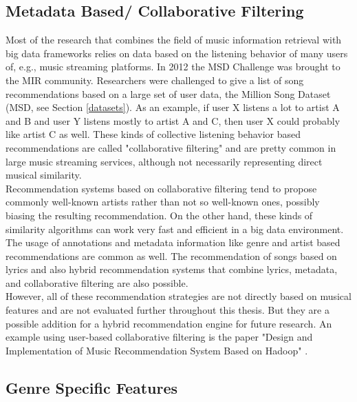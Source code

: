\subsection{Metadata Based/ Collaborative Filtering}\label{collaborative}

Most of the research that combines the field of music information retrieval with big data frameworks relies on data based on the listening behavior of many users of, e.g., music streaming platforms. In 2012 the MSD Challenge was brought to the MIR community. Researchers were challenged to give a list of song recommendations based on a large set of user data, the Million Song Dataset (MSD, see Section \ref{datasets}). As an example, if user X listens a lot to artist A and B and user Y listens mostly to artist A and C, then user X could probably like artist C as well. These kinds of collective listening behavior based recommendations are called "collaborative filtering" and are pretty common in large music streaming services, although not necessarily representing direct musical similarity. \cite[p. 192f.]{knees1}\\
Recommendation systems based on collaborative filtering tend to propose commonly well-known artists rather than not so well-known ones, possibly biasing the resulting recommendation. On the other hand, these kinds of similarity algorithms can work very fast and efficient in a big data environment. The usage of annotations and metadata information like genre and artist based recommendations are common as well. The recommendation of songs based on lyrics and also hybrid recommendation systems that combine lyrics, metadata, and collaborative filtering are also possible.\\
However, all of these recommendation strategies are not directly based on musical features and are not evaluated further throughout this thesis. But they are a possible addition for a hybrid recommendation engine for future research. 
An example using user-based collaborative filtering is the paper "Design and Implementation of Music Recommendation System Based on Hadoop" \cite{metadat1}. 

\subsection{Genre Specific Features}

